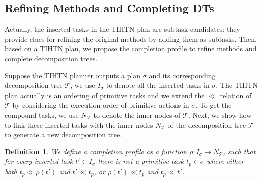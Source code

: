 \documentclass[letterpaper]{article} %
\newtheorem{definition}{Definition}
\renewcommand{\P}{\mathcal{P}}
\newcommand{\plan}{\sigma}
\newcommand{\Dtree}{\mathcal{T}}
\newcommand{\innernodes}{N_\Dtree}
\newcommand{\insertTask}{t'}
\newcommand{\primTask}{t_p}
\newcommand{\aspprec}{\ll}
\newcommand{\insertActions}{I}
\newcommand{\decomposeMethods}{N}
\newcommand{\improveFunction}{\rho}
\begin{document}
\subsection{Refining Methods and Completing DTs}
Actually, the inserted tasks in the TIHTN plan are subtask candidates: they provide clues for refining the original methods by adding them as subtasks.
Then, based on a TIHTN plan, we propose the completion profile to refine methods and complete decomposition trees.

Suppose the TIHTN planner outputs a plan $\plan$ and its corresponding decomposition tree $\Dtree$, we use $\insertActions_\plan$ to denote all the inserted tasks in $\plan$.
The TIHTN plan actually is an ordering of primitive tasks and we extend the $\aspprec$ relation of $\Dtree$ by considering the execution order of primitive actions in $\plan$.
To get the compound tasks, we use $\innernodes$ to denote the inner nodes of $\Dtree$.
Next, we show how to link these inserted tasks with the inner nodes $\innernodes$ of the decomposition tree $\Dtree$ to generate a new decomposition tree.
%

\begin{definition}%
\label{def_complete_profile}
We define a completion profile as a function $\improveFunction\! :\! \insertActions_\plan \longrightarrow \innernodes$, such that for every inserted task $\insertTask \in \insertActions_\plan$
there is not a primitive task $\primTask \in \plan$ where either both $\primTask \! \aspprec\!  \improveFunction(\insertTask)$ and $\insertTask \aspprec \primTask$, or $\improveFunction(\insertTask)  \aspprec \primTask$ and $\primTask  \aspprec  \insertTask$.
\end{definition}
\end{document}
